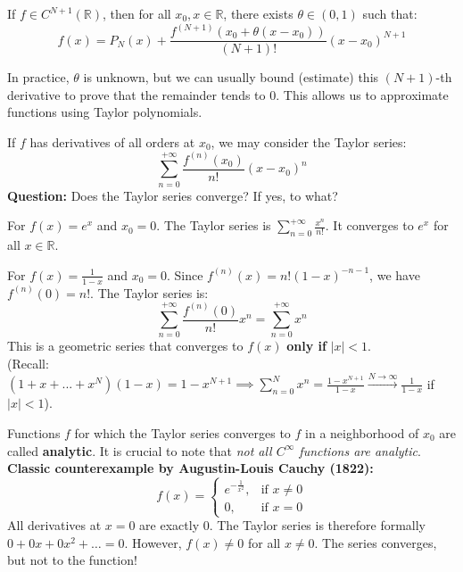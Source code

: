 \begin{theorem}
If $f \in C^{N+1}(\mathbb{R})$, then for all $x_0, x \in \mathbb{R}$, there exists $\theta \in (0, 1)$ such that:
$$f(x) = P_N(x) + \frac{f^{(N+1)}(x_0 + \theta(x - x_0))}{(N+1)!} (x - x_0)^{N+1}$$
\end{theorem}

In practice, $\theta$ is unknown, but we can usually bound (estimate) this $(N+1)$-th derivative to prove that the remainder tends to $0$. This allows us to approximate functions using Taylor polynomials.

If $f$ has derivatives of all orders at $x_0$, we may consider the Taylor series:
$$\sum_{n=0}^{+\infty} \frac{f^{(n)}(x_0)}{n!} (x - x_0)^n$$
\textbf{Question:} Does the Taylor series converge? If yes, to what?

\begin{example}
For $f(x) = e^x$ and $x_0 = 0$. The Taylor series is $\sum_{n=0}^{+\infty} \frac{x^n}{n!}$. It converges to $e^x$ for all $x \in \mathbb{R}$.
\end{example}

\begin{example}
For $f(x) = \frac{1}{1 - x}$ and $x_0 = 0$. Since $f^{(n)}(x) = n!(1-x)^{-n-1}$, we have $f^{(n)}(0) = n!$. The Taylor series is:
$$\sum_{n=0}^{+\infty} \frac{f^{(n)}(0)}{n!} x^n = \sum_{n=0}^{+\infty} x^n$$
This is a geometric series that converges to $f(x)$ \textbf{only if} $|x| < 1$. \\
(Recall: $(1 + x + ... + x^N)(1 - x) = 1 - x^{N+1} \implies \sum_{n=0}^N x^n = \frac{1 - x^{N+1}}{1 - x} \xrightarrow{N \to \infty} \frac{1}{1 - x}$ if $|x| < 1$).
\end{example}

\begin{verification}
Functions $f$ for which the Taylor series converges to $f$ in a neighborhood of $x_0$ are called \textbf{analytic}.
It is crucial to note that \textit{not all $C^\infty$ functions are analytic}.
\textbf{Classic counterexample by Augustin-Louis Cauchy (1822):}
$$f(x) = \begin{cases} e^{-\frac{1}{x^2}}, & \text{if } x \neq 0 \\ 0, & \text{if } x = 0 \end{cases}$$
All derivatives at $x=0$ are exactly $0$. The Taylor series is therefore formally $0 + 0x + 0x^2 + \dots = 0$. However, $f(x) \neq 0$ for all $x \neq 0$. The series converges, but not to the function!
\end{verification}

